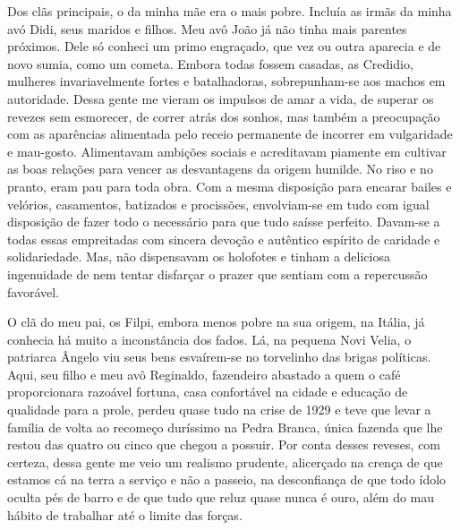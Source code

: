 Dos clãs principais, o da minha mãe era o mais pobre. 
Incluía as irmãs da minha avó Didi, seus maridos e filhos. 
Meu avô João já não tinha mais parentes próximos. 
Dele só conheci um primo engraçado, que vez ou outra aparecia e de novo sumia, como um cometa.  
Embora todas fossem casadas, as Credidio, mulheres invariavelmente fortes e batalhadoras, sobrepunham-se aos machos em autoridade. 
Dessa gente me vieram os impulsos de amar a vida, de superar os revezes sem esmorecer, de correr atrás dos sonhos, mas também a preocupação com as aparências alimentada pelo receio permanente de incorrer em vulgaridade e mau-gosto. 
Alimentavam ambições sociais e acreditavam piamente em cultivar as boas relações para vencer as desvantagens da origem humilde.  
No riso e no pranto, eram pau para toda obra. Com a mesma disposição para encarar bailes e velórios, casamentos, batizados e procissões, envolviam-se em tudo com igual disposição de fazer todo o necessário para que tudo saísse perfeito. 
Davam-se a todas essas empreitadas com sincera devoção e autêntico espírito de caridade e solidariedade. Mas, não dispensavam os holofotes e tinham a deliciosa ingenuidade de nem tentar disfarçar o prazer que sentiam com a repercussão favorável.

O clã do meu pai, os Filpi, embora menos pobre na sua origem, na Itália, já conhecia há muito a inconstância dos fados. 
Lá, na pequena Novi Velia, o patriarca Ângelo viu seus bens esvaírem-se no torvelinho das brigas políticas. 
Aqui, seu filho e meu avô Reginaldo, fazendeiro abastado a quem o café proporcionara razoável fortuna, casa confortável na cidade e educação de qualidade para a prole, perdeu quase tudo na crise de 1929 e teve que levar a família de volta ao recomeço duríssimo na Pedra Branca, única fazenda que lhe restou das quatro ou cinco que chegou a possuir. 
Por conta desses reveses, com certeza, dessa gente me veio um realismo prudente, alicerçado na crença de que estamos cá na terra a serviço e não a passeio, na desconfiança de que todo ídolo oculta pés de barro e de que tudo que reluz quase nunca é ouro, além do mau hábito de trabalhar até o limite das forças. 

